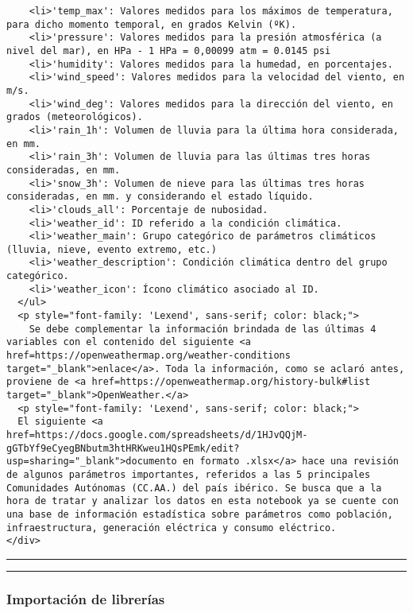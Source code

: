 \documentclass[11pt]{article}
\begin{document}
\begin{verbatim}
    <li>'temp_max': Valores medidos para los máximos de temperatura, para dicho momento temporal, en grados Kelvin (ºK).
    <li>'pressure': Valores medidos para la presión atmosférica (a nivel del mar), en HPa - 1 HPa = 0,00099 atm = 0.0145 psi
    <li>'humidity': Valores medidos para la humedad, en porcentajes.
    <li>'wind_speed': Valores medidos para la velocidad del viento, en m/s.
    <li>'wind_deg': Valores medidos para la dirección del viento, en grados (meteorológicos).
    <li>'rain_1h': Volumen de lluvia para la última hora considerada, en mm.
    <li>'rain_3h': Volumen de lluvia para las últimas tres horas consideradas, en mm.
    <li>'snow_3h': Volumen de nieve para las últimas tres horas consideradas, en mm. y considerando el estado líquido.
    <li>'clouds_all': Porcentaje de nubosidad.
    <li>'weather_id': ID referido a la condición climática.
    <li>'weather_main': Grupo categórico de parámetros climáticos (lluvia, nieve, evento extremo, etc.)
    <li>'weather_description': Condición climática dentro del grupo categórico.
    <li>'weather_icon': Ícono climático asociado al ID.
  </ul>   
  <p style="font-family: 'Lexend', sans-serif; color: black;">
    Se debe complementar la información brindada de las últimas 4 variables con el contenido del siguiente <a href=https://openweathermap.org/weather-conditions target="_blank">enlace</a>. Toda la información, como se aclaró antes, proviene de <a href=https://openweathermap.org/history-bulk#list target="_blank">OpenWeather.</a>
  <p style="font-family: 'Lexend', sans-serif; color: black;">
  El siguiente <a href=https://docs.google.com/spreadsheets/d/1HJvQQjM-gGTbYf9eCyegBNbutm3htHRKweu1HQsPEmk/edit?usp=sharing="_blank">documento en formato .xlsx</a> hace una revisión de algunos parámetros importantes, referidos a las 5 principales Comunidades Autónomas (CC.AA.) del país ibérico. Se busca que a la hora de tratar y analizar los datos en esta notebook ya se cuente con una base de información estadística sobre parámetros como población, infraestructura, generación eléctrica y consumo eléctrico.
</div>
\end{verbatim}

\begin{center}\rule{0.5\linewidth}{0.5pt}\end{center}

    \begin{center}\rule{0.5\linewidth}{0.5pt}\end{center}

\hypertarget{importaciuxf3n-de-libreruxedas}{%
\subsubsection{Importación de
librerías}\label{importaciuxf3n-de-libreruxedas}}
\end{document}
